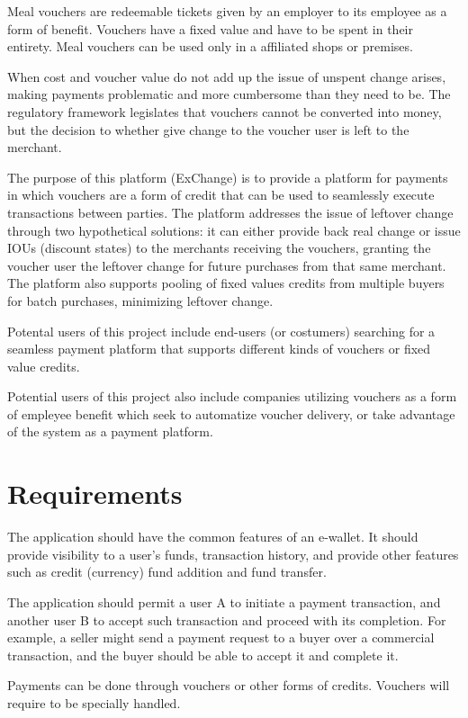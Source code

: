 Meal vouchers are redeemable tickets given by an employer to its employee as a form of benefit. Vouchers have a fixed value and have to be spent in their entirety. Meal vouchers can be used only in a affiliated shops or premises.

When cost and voucher value do not add up the issue of unspent change arises, making payments problematic and more cumbersome than they need to be. The regulatory framework legislates that vouchers cannot be converted into money, but the decision to whether give change to the voucher user is left to the merchant. 

The purpose of this platform (ExChange) is to provide a platform for payments in which vouchers are a form of credit that can be used to seamlessly execute transactions between parties. The platform addresses the issue of leftover change through two hypothetical solutions: it can either provide back real change or issue IOUs (discount states) to the merchants receiving the vouchers, granting the voucher user the leftover change for future purchases from that same merchant.
The platform also supports pooling of fixed values credits from multiple buyers for batch purchases, minimizing leftover change.

Potental users of this project include end-users (or costumers) searching for a seamless payment platform that supports different kinds of vouchers or fixed value credits.

Potential users of this project also include companies utilizing vouchers as a form of empleyee benefit which seek to automatize voucher delivery, or take advantage of the system as a payment platform.

\section{Requirements}
The application should have the common features of an e-wallet. 
It should provide visibility to a user's funds, transaction history, and provide other features such as credit (currency) fund addition and fund transfer.

The application should permit a user A to initiate a payment transaction, and another user B to accept such transaction and proceed with its completion. For example, a seller might send a payment request to a buyer over a commercial transaction, and the buyer should be able to accept it and complete it.

Payments can be done through vouchers or other forms of credits. Vouchers will require to be specially handled.

